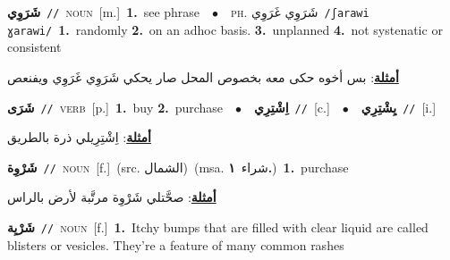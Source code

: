 \documentclass[10pt,a4paper,twoside]{article} %
\begin{document}
\begin{multicols}{2}
{\setlength\topsep{0pt}\textbf{\foreignlanguage{arabic}{شَرَوِي}}\ {\color{gray}\texttt{//}\color{black}}\ \textsc{noun}\ [m.]\ \textbf{1.}~see phrase\ \ $\bullet$\ \ \textsc{ph.} \color{gray} \foreignlanguage{arabic}{شَرَوِي غَرَوِي}\color{black}\ {\color{gray}\texttt{/{\sffamily ʃarawi ɣarawi}/}\color{black}}\ \textbf{1.}~randomly  \textbf{2.}~on an adhoc basis.  \textbf{3.}~unplanned  \textbf{4.}~not systenatic or consistent\  \begin{flushright}\color{gray}\foreignlanguage{arabic}{\textbf{\underline{\foreignlanguage{arabic}{أمثلة}}}: بس أخوه حكى معه بخصوص المحل صار يحكي شَرَوِي غَرَوِي ويفنعص}\end{flushright}\color{black}} \vspace{2mm}

{\setlength\topsep{0pt}\textbf{\foreignlanguage{arabic}{شَرَى}}\ {\color{gray}\texttt{//}\color{black}}\ \textsc{verb}\ [p.]\ \textbf{1.}~buy  \textbf{2.}~purchase\ \ $\bullet$\ \ \setlength\topsep{0pt}\textbf{\foreignlanguage{arabic}{اِشْتِرِي}}\ {\color{gray}\texttt{//}\color{black}}\ [c.]\ \ $\bullet$\ \ \setlength\topsep{0pt}\textbf{\foreignlanguage{arabic}{يِشْتِرِي}}\ {\color{gray}\texttt{//}\color{black}}\ [i.]\  \begin{flushright}\color{gray}\foreignlanguage{arabic}{\textbf{\underline{\foreignlanguage{arabic}{أمثلة}}}: اِشْتِرِيلي ذرة بالطريق}\end{flushright}\color{black}} \vspace{2mm}

{\setlength\topsep{0pt}\textbf{\foreignlanguage{arabic}{شَرْوِة}}\ {\color{gray}\texttt{//}\color{black}}\ \textsc{noun}\ [f.]\ (src. \color{gray}\foreignlanguage{arabic}{الشمال}\color{black})\ \color{gray}(msa. \foreignlanguage{arabic}{شراء}~\foreignlanguage{arabic}{\textbf{١.}})\color{black}\ \textbf{1.}~purchase\  \begin{flushright}\color{gray}\foreignlanguage{arabic}{\textbf{\underline{\foreignlanguage{arabic}{أمثلة}}}: صحَّتلي شَرْوِة مرتَّبة لأرض بالراس}\end{flushright}\color{black}} \vspace{2mm}

{\setlength\topsep{0pt}\textbf{\foreignlanguage{arabic}{شَرْيِة}}\ {\color{gray}\texttt{//}\color{black}}\ \textsc{noun}\ [f.]\ \textbf{1.}~Itchy bumps that are filled with clear liquid are called blisters or vesicles. They're a feature of many common rashes\ } \vspace{2mm}


\end{multicols}
\end{document}
